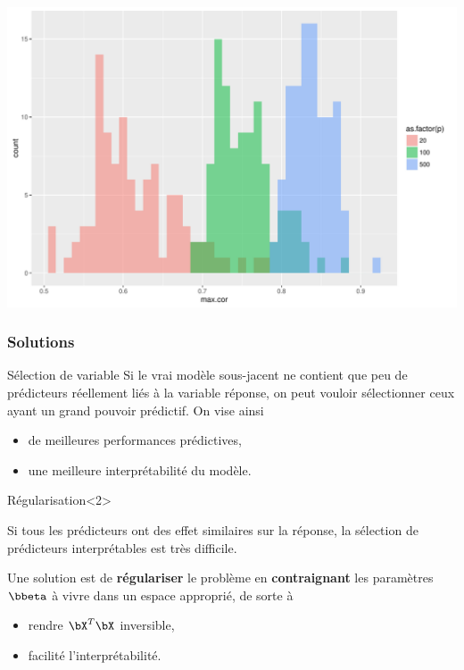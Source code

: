 \documentclass{beamer}\usepackage[]{graphicx}\usepackage[]{color}
\newenvironment{knitrout}{}{} %
\begin{document}
\begin{frame}
\begin{knitrout}\scriptsize
{}\color{fgcolor}
\includegraphics[width=\textwidth]{figures/highdim-unnamed-chunk-21-1} 

\end{knitrout}
\end{frame}

\begin{frame}
  \frametitle{Solutions}

  \begin{block}{Sélection de variable}
    Si le vrai modèle sous-jacent ne contient que peu de prédicteurs réellement liés à la variable réponse, on peut vouloir  \alert{sélectionner} ceux ayant un grand pouvoir prédictif. On vise ainsi
    \begin{itemize}
    \item de meilleures performances prédictives, 
    \item une meilleure interprétabilité du modèle.
    \end{itemize}
  \end{block}

  \vfill

  \begin{block}{Régularisation}<2> 

Si tous les prédicteurs ont des effet similaires sur la réponse, la sélection de prédicteurs interprétables est très difficile.

Une solution est de  \alert{\bf régulariser} le problème en  \alert{\bf contraignant} les paramètres  $\bbeta$ à vivre dans un espace approprié, de sorte à 
    \begin{itemize}
    \item rendre $\bX^T\bX$ inversible, 
    \item facilité l'interprétabilité.
    \end{itemize}
  \end{block}

\end{frame}
\end{document}
